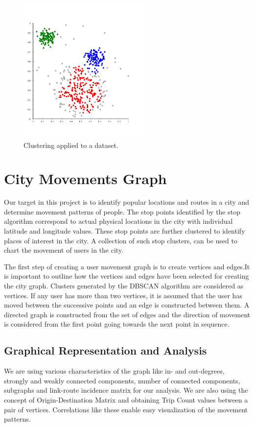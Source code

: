 \begin{figure}[!ht]
	\centering
	\includegraphics[width=0.6\textwidth]{images/clustering.png}
	\caption{ Clustering applied to a dataset. }
	\label{fig:clustering}
\end{figure} 

\FloatBarrier
\section{City Movements Graph}
\label{cha:movementsGraph}
Our target in this project is to identify popular locations and routes in a city and determine movement patterns of people. The stop points identified by the stop algorithm correspond to actual physical locations in the city with individual latitude and longitude values. These stop points are further clustered to identify places of interest in the city. A collection of such stop clusters, can be used to chart the movement of users in the city. 

The first step of creating a user movement graph is to create vertices and edges.It is important to outline how the vertices and edges have been selected for creating the city graph. Clusters generated by the DBSCAN algorithm are considered as vertices. If any user has more than two vertices, it is assumed that the user has moved between the successive points and an edge is constructed between them.  A directed graph is constructed from the set of edges and the direction of movement is considered from the first point going towards the next point in sequence.
\subsection{Graphical Representation and Analysis}
 We are using various characteristics of the graph like in- and out-degrees, strongly and weakly connected components, number of connected components, subgraphs and link-route incidence matrix \cite{kelly2008mathematics} for our analysis. We are also using the concept of Origin-Destination Matrix and obtaining Trip Count values between a pair of vertices. Correlations like these enable easy visualization of the movement patterns. 


